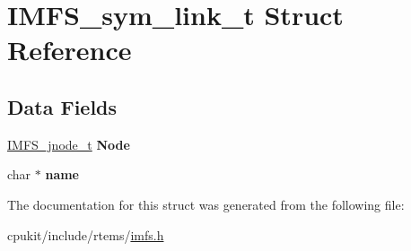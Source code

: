 \hypertarget{structIMFS__sym__link__t}{}\section{I\+M\+F\+S\+\_\+sym\+\_\+link\+\_\+t Struct Reference}
\label{structIMFS__sym__link__t}
\subsection*{Data Fields}
\begin{DoxyCompactItemize}
\item 
\mbox{\label{structIMFS__sym__link__t_ac2c5bfa1ef45465bd26a448506719d41}} 
\mbox{\hyperlink{structIMFS__jnode__tt}{I\+M\+F\+S\+\_\+jnode\+\_\+t}} {\bfseries Node}
\item 
\mbox{\label{structIMFS__sym__link__t_a133888483cdd0c4f7ff047f88dc551a2}} 
char $\ast$ {\bfseries name}
\end{DoxyCompactItemize}


The documentation for this struct was generated from the following file\+:\begin{DoxyCompactItemize}
\item 
cpukit/include/rtems/\mbox{\hyperlink{imfs_8h}{imfs.\+h}}\end{DoxyCompactItemize}
